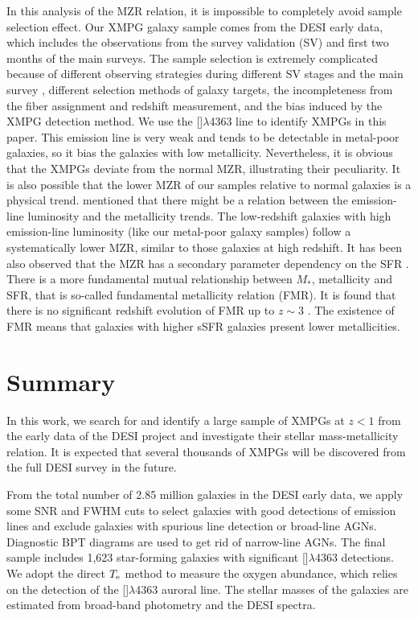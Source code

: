 \documentclass[twocolumn]{aastex631}
\newcommand{\OIIIFOT}{[\mbox{\ion{O}{3}}]$\lambda$4363}
\newcommand{\Te}{\mbox{$T_{\rm e}$}}
\newcommand{\boldtext}[1]{\textcolor[rgb]{0,0,0}{#1}}
\begin{document}
In this analysis of the MZR relation, it is impossible to completely avoid sample selection effect. Our XMPG galaxy sample comes from the DESI early data, which includes the observations from the survey validation (SV) and first two months of the main surveys. The sample selection is extremely complicated because of different observing strategies during different SV stages and the main survey \citep{Des23a}, different selection methods of galaxy targets, the incompleteness from the fiber assignment and redshift measurement, and the bias induced by the XMPG detection method. We use the {\OIIIFOT} line to identify XMPGs in this paper. This emission line is very weak and tends to be detectable in metal-poor galaxies, so it bias the galaxies with low metallicity. Nevertheless, it is obvious that the XMPGs deviate from the normal MZR, illustrating their peculiarity. It is also possible that the lower MZR of our samples relative to normal galaxies is a physical trend. \citet{Jun14} mentioned that there might be a relation between the emission-line luminosity and the metallicity trends. The low-redshift galaxies with high emission-line luminosity (like our metal-poor galaxy samples) follow a systematically lower MZR, similar to those galaxies at high redshift. \boldtext{It has been also observed that the MZR has a secondary parameter dependency on the SFR \citep{Ell08, Man10}. There is a more fundamental mutual relationship between $M_*$, metallicity and SFR, that is so-called fundamental metallicity relation (FMR). It is found that there is no significant redshift evolution of FMR up to $z\sim3$ \citep{Man10}. The existence of FMR means that galaxies with higher sSFR galaxies present lower metallicities.} 

\section{Summary} \label{sec:summary}
In this work, we search for and identify a large sample of XMPGs at $z <1$ from the early data of the DESI project and investigate their stellar mass-metallicity relation. It is expected that several thousands of XMPGs will be discovered from the full DESI survey in the future. 

From the total number of 2.85 million galaxies in the DESI early data, we apply some SNR and FWHM cuts to select galaxies with good detections of emission lines and exclude galaxies with spurious line detection or broad-line AGNs. Diagnostic BPT diagrams are used to get rid of narrow-line AGNs. The final sample includes 1,623 star-forming galaxies with significant {\OIIIFOT} detections. We adopt the direct {\Te} method to measure the oxygen abundance, which relies on the detection of the {\OIIIFOT} auroral line. The stellar masses of the galaxies are estimated from broad-band photometry and the DESI spectra. 
\end{document}
